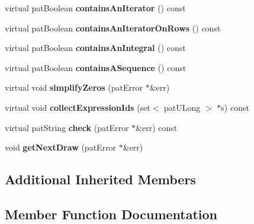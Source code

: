 \begin{DoxyCompactItemize}
virtual pat\+Boolean {\bfseries contains\+An\+Iterator} () const
\item 
\mbox{\label{classbio_arith_bayes_mean_a11bcb7619df3d8203b651ecf26ff2cf9}} 
virtual pat\+Boolean {\bfseries contains\+An\+Iterator\+On\+Rows} () const
\item 
\mbox{\label{classbio_arith_bayes_mean_a0d451cf413da02b78b2111157d36c6a7}} 
virtual pat\+Boolean {\bfseries contains\+An\+Integral} () const
\item 
\mbox{\label{classbio_arith_bayes_mean_ace10f529d0005ba435b6db5613cfbb77}} 
virtual pat\+Boolean {\bfseries contains\+A\+Sequence} () const
\item 
\mbox{\label{classbio_arith_bayes_mean_ad397eeeb6fb7a7b08438e08bfb71b02c}} 
virtual void {\bfseries simplify\+Zeros} (pat\+Error $\ast$\&err)
\item 
\mbox{\label{classbio_arith_bayes_mean_a557f40635e7c33c94fd335b900327cab}} 
virtual void {\bfseries collect\+Expression\+Ids} (set$<$ pat\+U\+Long $>$ $\ast$s) const
\item 
\mbox{\label{classbio_arith_bayes_mean_a0a7e77c8215f576b1f94610e8b9c8336}} 
virtual pat\+String {\bfseries check} (pat\+Error $\ast$\&err) const
\item 
\mbox{\label{classbio_arith_bayes_mean_ac7950e267386a7c0b2a44806262f5ef1}} 
void {\bfseries get\+Next\+Draw} (pat\+Error $\ast$\&err)
\end{DoxyCompactItemize}
\subsection*{Additional Inherited Members}


\subsection{Member Function Documentation}
\mbox{\label{classbio_arith_bayes_mean_ac37c22c5d01ae43834f930a39bca5039}} 

